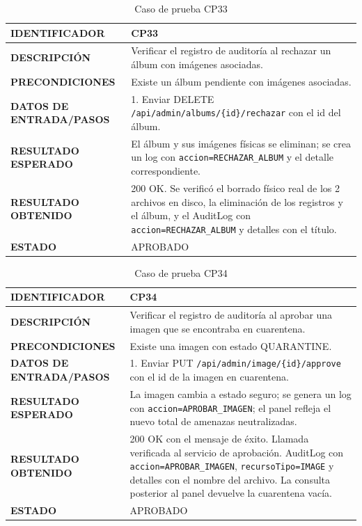 \begin{table}[H]
\centering
\caption{Caso de prueba CP33}
\begin{tabular}{|p{3.5cm}|p{10.3cm}|}
\hline
\textbf{IDENTIFICADOR} & CP33 \\
\hline
\textbf{DESCRIPCIÓN} & Verificar el registro de auditoría al rechazar un álbum con imágenes asociadas. \\
\hline
\textbf{PRECONDICIONES} & Existe un álbum pendiente con imágenes asociadas. \\
\hline
\textbf{DATOS DE ENTRADA/PASOS} & 1. Enviar DELETE \texttt{/api/admin/albums/\{id\}/rechazar} con el id del álbum. \\
\hline
\textbf{RESULTADO ESPERADO} & El álbum y sus imágenes físicas se eliminan; se crea un log con \texttt{accion=RECHAZAR\_ALBUM} y el detalle correspondiente. \\
\hline
\textbf{RESULTADO OBTENIDO} & 200 OK. Se verificó el borrado físico real de los 2 archivos en disco, la eliminación de los registros y el álbum, y el AuditLog con \texttt{accion=RECHAZAR\_ALBUM} y detalles con el título. \\
\hline
\textbf{ESTADO} & APROBADO \\
\hline
\end{tabular}
\end{table}

\begin{table}[H]
\centering
\caption{Caso de prueba CP34}
\begin{tabular}{|p{3.5cm}|p{10.3cm}|}
\hline
\textbf{IDENTIFICADOR} & CP34 \\
\hline
\textbf{DESCRIPCIÓN} & Verificar el registro de auditoría al aprobar una imagen que se encontraba en cuarentena. \\
\hline
\textbf{PRECONDICIONES} & Existe una imagen con estado QUARANTINE. \\
\hline
\textbf{DATOS DE ENTRADA/PASOS} & 1. Enviar PUT \texttt{/api/admin/image/\{id\}/approve} con el id de la imagen en cuarentena. \\
\hline
\textbf{RESULTADO ESPERADO} & La imagen cambia a estado seguro; se genera un log con \texttt{accion=APROBAR\_IMAGEN}; el panel refleja el nuevo total de amenazas neutralizadas. \\
\hline
\textbf{RESULTADO OBTENIDO} & 200 OK con el mensaje de éxito. Llamada verificada al servicio de aprobación. AuditLog con \texttt{accion=APROBAR\_IMAGEN}, \texttt{recursoTipo=IMAGE} y detalles con el nombre del archivo. La consulta posterior al panel devuelve la cuarentena vacía. \\
\hline
\textbf{ESTADO} & APROBADO \\
\hline
\end{tabular}
\end{table}

